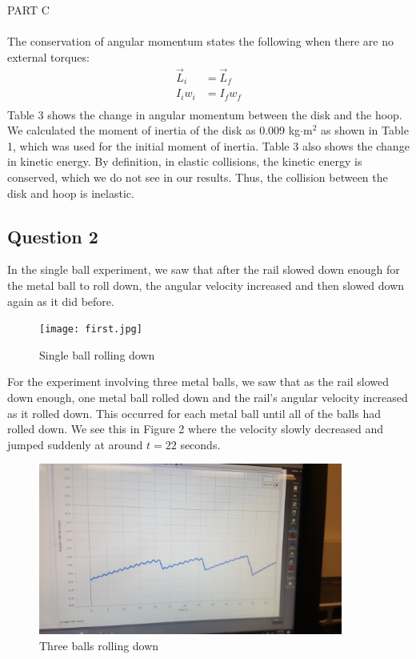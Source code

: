 \documentclass [12pt, letterpaper, twoside] {article}
\begin{document}
\noindent
PART C \\\\
The conservation of angular momentum states the following when there are no external torques:
\begin {equation*}
  \begin {split}
    \vec{L}_{i} &= \vec{L}_{f} \\
    I_{i}w_{i} &= I_{f}w_{f} \\ 
  \end {split}
\end {equation*}
Table 3 shows the change in angular momentum between the disk and the hoop. We calculated the moment of inertia of the disk as 0.009 kg\(\cdot\text{m}^2\) as shown in Table 1, which was used for the initial moment of inertia. Table 3 also shows the change in kinetic energy. By definition, in elastic collisions, the kinetic energy is conserved, which we do not see in our results. Thus, the collision between the disk and hoop is inelastic.

\subsection* {Question 2}
In the single ball experiment, we saw that after the rail slowed down enough for the metal ball to roll down, the angular velocity increased and then slowed down again as it did before. 

\begin {figure}[h!]
  \centering
  \texttt{[image: first.jpg]} %
  \caption {Single ball rolling down}
\end {figure}

\noindent
For the experiment involving three metal balls, we saw that as the rail slowed down enough, one metal ball rolled down and the rail's angular velocity increased as it rolled down. This occurred for each metal ball until all of the balls had rolled down. We see this in Figure 2 where the velocity slowly decreased and jumped suddenly at around \(t = 22\) seconds. 

\begin {figure}[h!]
  \centering
  \includegraphics[width=100mm,scale=0.5]{second.jpg}
  \caption {Three balls rolling down}
\end {figure}
\end{document}
